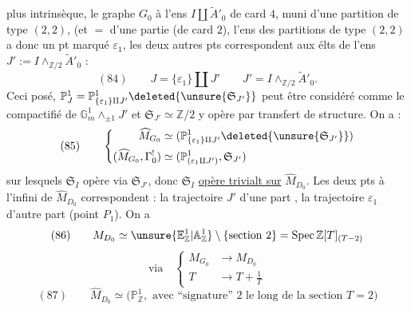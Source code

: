 plus intrinsèque, le graphe $G_0$   à l'ens $I\amalg\widetilde A'_0$ de card $4$, muni d'une partition de type $(2,2)$, (et $=$ d'une partie  (de card $2$), l'ens  des  partitions de type $(2,2)$ a donc un pt marqué $\varepsilon_1$, les deux autres pts correspondent aux élts de l'ens $J':=I\wedge_{\mathbb Z/2}\widetilde A'_0$ :
\[
(84)\qquad J=\{\varepsilon_1\}\amalg J'\qquad J'=I\wedge_{\mathbb Z/2}\widetilde A'_0.
\]
Ceci posé, $\mathbb P^1_J=\mathbb P^1_{\{\varepsilon_1\}\amalg J'}\deleted{\unsure{\mathfrak S_{J'}}}$ peut être considéré comme le compactifié de $\mathbb G_m^{1}\wedge_{\pm1}J'$ et  $\mathfrak S_{J'}\simeq\mathbb Z/2$ y opère par transfert de structure. On a :
\[
(85)\qquad
\left\{\begin{aligned}
\widehat M_{G_0}&\simeq(\mathbb P^1_{\{\varepsilon_1\}\amalg J'}\deleted{\unsure{\mathfrak S_{J'}}})\\
(\widehat M_{G_0},\Gamma^!_0)&\simeq(\mathbb P^1_{(\varepsilon_1\amalg J')},\mathfrak S_{J'})
\end{aligned}\right.
\]
sur lesquels $\mathfrak S_I$ opère via $\mathfrak S_{J'}$, donc $\mathfrak S_I$ \uline{opère trivialt sur} $\widehat M_{D_0}$. Les deux pts à l'infini de $\widehat M_{D_0}$ correspondent : la trajectoire $J'$ d'une part , la trajectoire $\varepsilon_1$ d'autre part (point $P_1$). On a
\[
(86)\qquad M_{D_0}\simeq\unsure{\mathbb E^1_{\mathbb Z}|\mathbb A^1_{\mathbb Z}}\setminus\{\text{section }2\}=\operatorname{Spec}\mathbb Z[T]_{(T-2)}
\]
\[
\text{via}\quad\left\{\begin{aligned}M_{G_0}&\longrightarrow M_{D_0}\\ T&\longrightarrow T+\frac1T\end{aligned}\right.
\]
\[
(87)\qquad\widehat M_{D_0}\simeq\bigl(\mathbb P^1_{\mathbb Z},\text{ avec ``signature'' }2\text{ le long de la section }T=2\bigr)
\]
